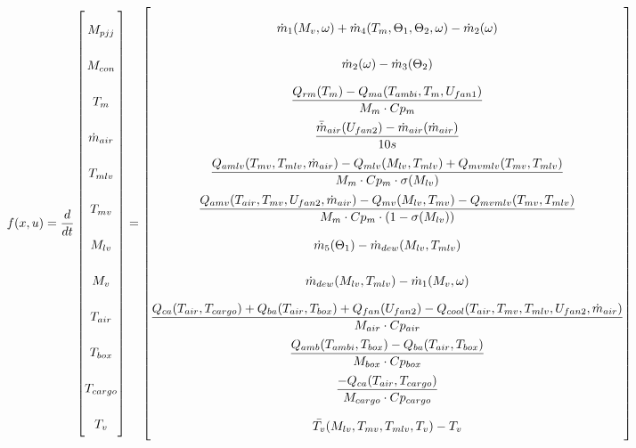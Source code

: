 \begin{equation} \label{eq:f_noSub} \renewcommand{\arraystretch}{2.4}
	f(x,u) =  \dfrac{d}{dt} \begin{bmatrix}
		M_{pjj}			\\				%
		M_{con} 		\\				%
		T_m 			\\				%
		\dot{m}_{air}	\\				%
		T_{mlv}			\\				%
		T_{mv}			\\				%
		M_{lv}			\\				%
		M_v				\\				%
		T_{air}			\\				%
		T_{box}			\\				%
		T_{cargo}		\\				%
		T_v								%
	\end{bmatrix}
	=
	\begin{bmatrix}
		\dot{m}_1(M_{v}, \omega) + \dot{m}_4(T_m,\Theta_1,\Theta_2,\omega) - \dot{m}_2(\omega) \\										%
		\dot{m}_{2}(\omega) - \dot{m}_{3}(\Theta_2)	\\												%
		\dfrac{Q_{rm}(T_m) - Q_{ma}(T_{ambi}, T_m, U_{fan1})}{M_m \cdot Cp_m} \\									%
		\dfrac{\bar{\dot{m}}_{air}(U_{fan2})  - \dot{m}_{air}(\dot{m}_{air})} {10s}		\\					%
		\dfrac{Q_{amlv}(T_{mv},T_{mlv},\dot{m}_{air})-Q_{mlv}(M_{lv},T_{mlv}) + Q_{mvmlv}(T_{mv},T_{mlv})}{M_m \cdot Cp_m \cdot \sigma(M_{lv})}        \\	%
		\dfrac{Q_{amv}(T_{air},T_{mv},U_{fan2},\dot{m}_{air}) - Q_{mv}(M_{lv},T_{mv}) - Q_{mvmlv}(T_{mv},T_{mlv})}{M_m \cdot Cp_m \cdot (1- \sigma(M_{lv}))}	\\	%
		\dot{m}_{5}(\Theta_1) - \dot{m}_{dew}(M_{lv},T_{mlv})		\\											%
		\dot{m}_{dew}(M_{lv},T_{mlv}) - \dot{m}_1(M_{v}, \omega)	\\												%
		\dfrac{Q_{ca}(T_{air},T_{cargo}) + Q_{ba}(T_{air},T_{box}) + Q_{fan}(U_{fan2}) - Q_{cool}(T_{air},T_{mv},T_{mlv},U_{fan2},\dot{m}_{air})}{M_{air} \cdot Cp_{air}} \\					%
		\dfrac{Q_{amb}(T_{ambi},T_{box}) -  Q_{ba}(T_{air},T_{box})}{M_{box} \cdot Cp_{box}} \\							%
		\dfrac{-Q_{ca}(T_{air},T_{cargo})}{M_{cargo} \cdot Cp_{cargo}}									\\	%
		\bar{T_v}(M_{lv},T_{mv},T_{mlv},T_v) - T_v 
	\end{bmatrix}
\end{equation}

